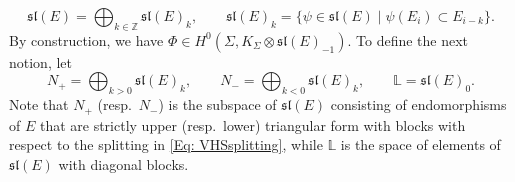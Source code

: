 \documentclass[pdftex]{sigma}
\numberwithin{equation}{section}
\theoremstyle{definition}
\begin{document}
\[%
\mathfrak{sl}(E) = \bigoplus_{k\in\mathbb{Z}} \mathfrak{sl}(E)_k,\qquad
\mathfrak{sl}(E)_k = \{\psi \in \mathfrak{sl}(E) \mid \psi(E_i) \subset E_{i-k} \}.
\]
By construction, we have $\Phi \in H^0(\Sigma, K_\Sigma\otimes \mathfrak{sl}(E)_{-1})$.
To define the next notion, let
\begin{equation}\label{eq:def_N+}
N_+ = \bigoplus_{k>0} \mathfrak{sl}(E)_k ,\qquad N_- = \bigoplus_{k<0 } \mathfrak{sl}(E)_k, \qquad
\mathbb{L} = \mathfrak{sl}(E)_0.
\end{equation}
Note that $N_+$ (resp.\ $N_-$) is the subspace of $\mathfrak{sl}(E)$ consisting of endomorphisms
of $E$ that are strictly upper (resp.\ lower) triangular form with blocks with respect to the
splitting in \eqref{Eq: VHSsplitting}, while $\mathbb{L}$ is the space of
elements of $\mathfrak{sl}(E)$ with diagonal blocks.
\end{document}

